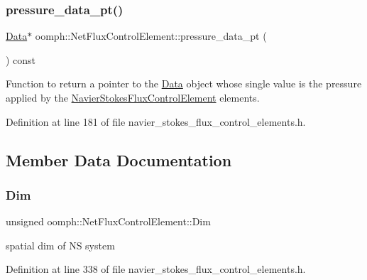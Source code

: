\subsubsection{\texorpdfstring{pressure\+\_\+data\+\_\+pt()}{pressure\_data\_pt()}}
{\footnotesize\ttfamily \hyperlink{classoomph_1_1Data}{Data}$\ast$ oomph\+::\+Net\+Flux\+Control\+Element\+::pressure\+\_\+data\+\_\+pt (\begin{DoxyParamCaption}{ }\end{DoxyParamCaption}) const\hspace{0.3cm}{\ttfamily [inline]}}



Function to return a pointer to the \hyperlink{classoomph_1_1Data}{Data} object whose single value is the pressure applied by the \hyperlink{classoomph_1_1NavierStokesFluxControlElement}{Navier\+Stokes\+Flux\+Control\+Element} elements. 



Definition at line 181 of file navier\+\_\+stokes\+\_\+flux\+\_\+control\+\_\+elements.\+h.



\subsection{Member Data Documentation}
\mbox{\label{classoomph_1_1NetFluxControlElement_a1ae25acba7d703f73151e8977216eefc}} 
\subsubsection{\texorpdfstring{Dim}{Dim}}
{\footnotesize\ttfamily unsigned oomph\+::\+Net\+Flux\+Control\+Element\+::\+Dim\hspace{0.3cm}{\ttfamily [private]}}



spatial dim of NS system 



Definition at line 338 of file navier\+\_\+stokes\+\_\+flux\+\_\+control\+\_\+elements.\+h.

\mbox{\label{classoomph_1_1NetFluxControlElement_a80e84d97293e349064804d4141f3aeaf}} 
